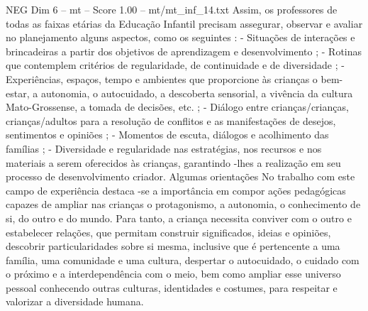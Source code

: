 \begin{textsample}{NEG Dim 6 – mt – Score 1.00 – mt/mt\_inf\_14.txt}
Assim, os professores de todas as faixas etárias da Educação Infantil precisam assegurar, observar e avaliar no planejamento alguns aspectos, como os seguintes : - Situações de interações e brincadeiras a partir dos objetivos de aprendizagem e desenvolvimento ; - Rotinas que contemplem critérios de regularidade, de continuidade e de diversidade ; - Experiências, espaços, tempo e ambientes que proporcione às crianças o bem-estar, a autonomia, o autocuidado, a descoberta sensorial, a vivência da cultura Mato-Grossense, a tomada de decisões, etc. ; - Diálogo entre crianças/crianças, crianças/adultos para a resolução de conflitos e as manifestações de desejos, sentimentos e opiniões ; - Momentos de escuta, diálogos e acolhimento das famílias ; - Diversidade e regularidade nas estratégias, nos recursos e nos materiais a serem oferecidos às crianças, garantindo -lhes a realização em seu processo de desenvolvimento criador.
Algumas orientações No trabalho com este campo de experiência destaca -se a importância em compor ações pedagógicas capazes de ampliar nas crianças o protagonismo, a autonomia, o conhecimento de si, do outro e do mundo.
Para tanto, a criança necessita conviver com o outro e estabelecer relações, que permitam construir significados, ideias e opiniões, descobrir particularidades sobre si mesma, inclusive que é pertencente a uma família, uma comunidade e uma cultura, despertar o autocuidado, o cuidado com o próximo e a interdependência com o meio, bem como ampliar esse universo pessoal conhecendo outras culturas, identidades e costumes, para respeitar e valorizar a diversidade humana.

\end{textsample}
